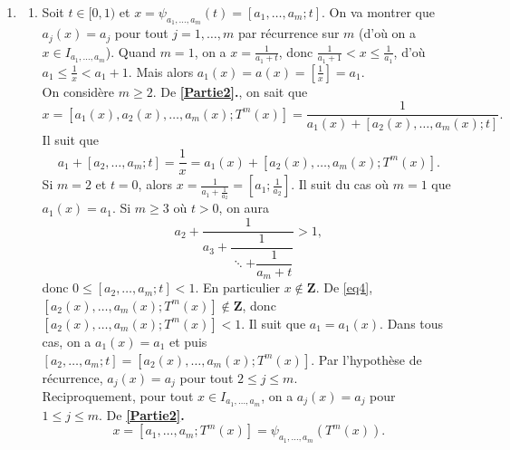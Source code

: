 \documentclass[french]{article}
\theoremstyle{definition}
\newcommand{\cin}[1]{\left[#1\right]}
\newcommand{\Zbb}{\mathbf{Z}}
\begin{document}
\begin{enumerate}
    \item \label{Partie7}
        \begin{enumerate}
            \item \label{Partie7a} Soit $t \in [0,1)$ et $x = \psi_{a_1,\ldots,a_m}(t) = [a_1,\ldots,a_m;t]$. On va montrer que $a_j(x) = a_j$ pour tout $j = 1,\ldots,m$ par r\'ecurrence sur $m$ (d'o\`u on a $x \in I_{a_1,\ldots,a_m}$). Quand $m = 1$, on a $x = \frac{1}{a_1 + t}$, donc $\frac{1}{a_1 + 1} < x \le \frac{1}{a_1}$, d'o\`u $a_1 \le \frac{1}{x} < a_1 + 1$. Mais alors $a_1(x) = a(x) = \cin{\frac{1}{x}} = a_1$. \\
            On consid\`ere $m \ge 2$. De {\bf\ref{Partie2}.}, on sait que
                $$x = [a_1(x),a_2(x),\ldots,a_m(x);T^m(x)] = \frac{1}{a_1(x) + [a_2(x),\ldots,a_m(x);t]}.$$
            Il suit que 
                \begin{equation} \label{eq4}
                    a_1 + [a_2,\ldots,a_m;t] = \frac{1}{x} = a_1(x) + [a_2(x),\ldots,a_m(x);T^m(x)].
                \end{equation}
            Si $m = 2$ et $t = 0$, alors $x = \frac{1}{a_1 + \frac{1}{a_2}} = [a_1;\frac{1}{a_2}]$. Il suit du cas o\`u $m=1$ que $a_1(x) = a_1$. Si $m \ge 3$ o\`u $t > 0$, on aura
                $$a_2 + \frac{1}{a_3 + \dfrac{1}{ \ddots + \dfrac{1}{a_m + t}}} > 1,$$
            donc $0 \le [a_2,\ldots,a_m;t] < 1$. En particulier $x \notin \Zbb$. De \eqref{eq4}, $[a_2(x),\ldots,a_m(x);T^m(x)] \notin \Zbb$, donc $[a_2(x),\ldots,a_m(x);T^m(x)] < 1$. Il suit que $a_1 = a_1(x)$. Dans tous cas, on a $a_1(x) = a_1$ et puis $[a_2,\ldots,a_m;t] = [a_2(x),\ldots,a_m(x);T^m(x)]$. Par l'hypoth\`ese de r\'ecurrence, $a_j(x) = a_j$ pour tout $2 \le j \le m$. \\
            Reciproquement, pour tout $x \in I_{a_1,\dots,a_m}$, on a $a_j(x) = a_j$ pour $1 \le j \le m$. De {\bf \ref{Partie2}.}
                $$x = [a_1,\ldots,a_m;T^m(x)] = \psi_{a_1,\ldots,a_m}(T^m(x)).$$
                

\end{enumerate}
\end{enumerate}
\end{document}
